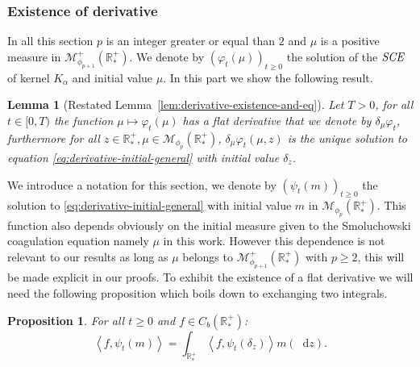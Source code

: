 \documentclass[11pt,a4paper]{article}
\newcommand{\RRP}{\mathbb{R}^+_*}
\newcommand{\MC}{\mathcal{M}}
\newcommand{\SCE}{\emph{SCE}}
\newcommand{\Proc}[1]{\left(#1\right)_{t\geq 0}}
\newcommand{\brac}[1]{\left\langle#1\right\rangle}
\newcommand{\dd}{\mathop{}\!\mathrm{d}}
\newtheorem{lemma}[theorem]{Lemma}
\newtheorem{proposition}[theorem]{Proposition}
\begin{document}
\subsubsection{Existence of derivative}
In all this section $p$ is an integer greater or equal than $2$ and $\mu$ is a positive measure in $\MC^+_{\phi_{p+1}}(\RRP)$. We denote by $\Proc{\varphi_t(\mu)}$ the solution of the $\SCE$ of kernel $K_\alpha$ and initial value $\mu$. In this part we show the following result.
\begin{lemma}[Restated Lemma~\ref{lem:derivative-existence-and-eq}]
    Let $T > 0$, for all $t \in [0,T)$ the function $ \mu \mapsto \varphi_t(\mu)$ has a flat derivative that we denote by $\delta_\mu\varphi_t$, furthermore for all $z \in \RRP, \mu \in \MC_{\phi_p}(\RRP)$, $\delta_\mu\varphi_t(\mu,z)$ is the unique solution to equation \eqref{eq:derivative-initial-general} with initial value $\delta_z$.
\end{lemma}
We introduce a notation for this section, we denote by $\Proc{\psi_t(m)}$ the solution to \eqref{eq:derivative-initial-general} with initial value $m$ in $\MC_{\phi_p}(\RRP)$. This function also depends obviously on the initial measure given to the Smoluchowski coagulation equation namely $\mu$ in this work. However this dependence is not relevant to our results as long as $\mu$ belongs to $\MC^+_{\phi_{p+1}}(\RRP)$ with $p\geq 2$, this will be made explicit in our proofs. To exhibit the existence of a flat derivative we will need the following proposition which boils down to exchanging two integrals.
\begin{proposition}\label{prop:derivative-prop-fubini}
    For all $t \geq 0$ and $f \in C_b(\RRP)$:
    \[\brac{f,\psi_t(m)} = \int_{\RRP} \brac{f,\psi_t\left(\delta_z\right)}m(\dd z).\]
\end{proposition}
\end{document}
